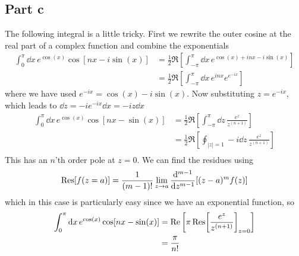 \documentclass[a4paper,12pt]{article}
\begin{document}
\subsection*{Part c}
The following integral is a little tricky. First we rewrite the outer cosine at the real part of a complex function and combine the exponentials
\begin{equation}
\begin{aligned}
\int_{0}^{\pi}\dd x\, e^{\cos(x)}\cos[nx-i\sin(x)]&=\frac{1}{2}\Re\left[\int_{-\pi}^{\pi}\dd x\, e^{\cos(x)+inx-i\sin(x)}\right]\\
&=\frac{1}{2}\Re\left[\int_{-\pi}^{\pi}\dd x\, e^{inx}e^{e^{-ix}}\right]
\end{aligned}
\end{equation}
where we have used $e^{-ix}=\cos(x)-i\sin(x)$. Now
substituting $z=e^{-ix}$, which leads to $\dd z=-i e^{-ix} \dd x=-iz \dd x$
\begin{equation}
	\begin{aligned}
\int_{0}^{\pi}\dd x\, e^{\cos(x)}\cos[nx-\sin(x)]&=\frac{1}{2}\Re\left[\int_{-\pi}^{\pi}\dd z\, \frac{e^{z}}{z^{(n+1)}}\right]\\
&=\frac{1}{2}\Re\left[\oint_{|z|=1}-i\dd z\, \frac{e^{z}}{z^{(n+1)}}\right]\\
	\end{aligned}
\end{equation}
This has an $n$'th order pole at $z=0$. We can find the residues using
\begin{equation}
	\Res[f(z=a)]=\frac{1}{(m-1)!}\lim_{z\to a}\dv[m-1]{}{z}[(z-a)^mf(z)]
\end{equation}
which in this case is particularly easy since we have an exponential function, so
\begin{equation}
	\begin{aligned}
		\int_{0}^{\pi}\dd x\, e^{\cos(x)}\cos[nx-\sin(x)]&=
		\Re\left [\pi \Res[\frac{e^{z}}{z^{(n+1)}}]_{z=0}\right]\\
		&=\frac{\pi}{n!}
	\end{aligned}
\end{equation}
\end{document}
